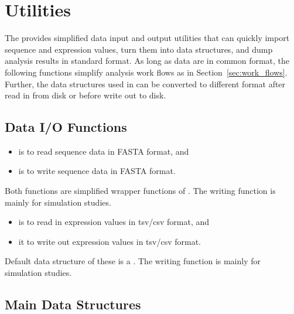 
\section[Utilities]{Utilities}
\label{sec:utilities}

The  provides simplified data input and output utilities that
can quickly import sequence and expression values, turn them into
 data structures, and dump analysis results in standard format.
As long as data are in common format, the following functions simplify
analysis work flows as in Section~\ref{sec:work_flows}.
Further, the  data structures used in  can be
converted to different format after read in from disk or
before write out to disk.


\subsection[Data I/O Functions]{Data I/O Functions}
\label{sec:data_io}

\begin{itemize}
\item {} is to read sequence data in FASTA format, and
\item {} is to write sequence data in FASTA format.
\end{itemize}
Both functions are simplified wrapper functions of .
The writing function is mainly for simulation studies.

\begin{itemize}
\item {} is to read in expression values in tsv/csv format, and
\item {} it to write out expression values in tsv/csv format.
\end{itemize}
Default data structure of these is a .
The writing function is mainly for simulation studies.


\subsection[Main Data Structures]{Main Data Structures}
\label{sec:main_data_structures}

